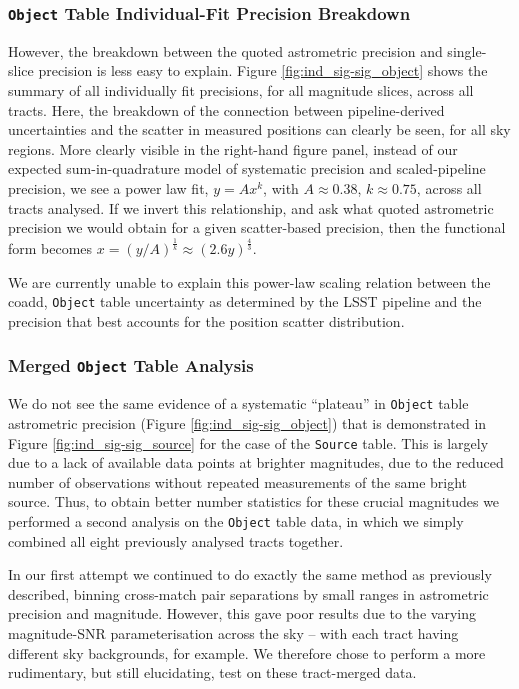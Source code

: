 \documentclass[SE,lsstdraft,authoryear,toc]{lsstdoc}
\begin{document}
\subsubsection{\texttt{Object} Table Individual-Fit Precision Breakdown}
However, the breakdown between the quoted astrometric precision and single-slice precision is less easy to explain.
Figure \ref{fig:ind_sig-sig_object} shows the summary of all individually fit precisions, for all magnitude slices, across all tracts.
Here, the breakdown of the connection between pipeline-derived uncertainties and the scatter in measured positions can clearly be seen, for all sky regions.
More clearly visible in the right-hand figure panel, instead of our expected sum-in-quadrature model of systematic precision and scaled-pipeline precision, we see a power law fit, $y = A x^k$, with $A \approx 0.38$, $k \approx 0.75$, across all tracts analysed.
If we invert this relationship, and ask what quoted astrometric precision we would obtain for a given scatter-based precision, then the functional form becomes $x = (y/A)^\frac{1}{k} \approx (2.6 y)^\frac{4}{3}$.

We are currently unable to explain this power-law scaling relation between the coadd, \texttt{Object} table uncertainty as determined by the LSST pipeline and the precision that best accounts for the position scatter distribution.

\subsubsection{Merged \texttt{Object} Table Analysis}
We do not see the same evidence of a systematic ``plateau'' in \texttt{Object} table astrometric precision (Figure \ref{fig:ind_sig-sig_object}) that is demonstrated in Figure \ref{fig:ind_sig-sig_source} for the case of the \texttt{Source} table.
This is largely due to a lack of available data points at brighter magnitudes, due to the reduced number of observations without repeated measurements of the same bright source.
Thus, to obtain better number statistics for these crucial magnitudes we performed a second analysis on the \texttt{Object} table data, in which we simply combined all eight previously analysed tracts together.

In our first attempt we continued to do exactly the same method as previously described, binning cross-match pair separations by small ranges in astrometric precision and magnitude.
However, this gave poor results due to the varying magnitude-SNR parameterisation across the sky -- with each tract having different sky backgrounds, for example.
We therefore chose to perform a more rudimentary, but still elucidating, test on these tract-merged data.
\end{document}
